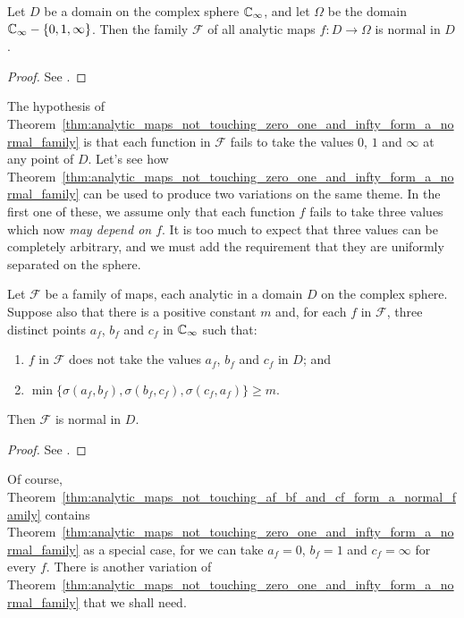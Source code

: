 \begin{theorem}
    \label{thm:analytic_maps_not_touching_zero_one_and_infty_form_a_normal_family}
    Let $D$ be a domain on the complex sphere $\mathbb{C}_\infty$, and let $\Omega$ be the
    domain $\mathbb{C}_\infty - \{0, 1, \infty\}$. Then the family $\mathcal{F}$ of all
    analytic maps $f: D \to \Omega$ is normal in $D$.
\end{theorem}
\begin{proof}
    See \cite[59]{Beardon1991}.
\end{proof}

The hypothesis of
Theorem~\ref{thm:analytic_maps_not_touching_zero_one_and_infty_form_a_normal_family}
is that each function in $\mathcal{F}$ fails to take the values $0$, $1$ and
$\infty$ at any point of $D$. Let's see how
Theorem~\ref{thm:analytic_maps_not_touching_zero_one_and_infty_form_a_normal_family}
can be used to produce two variations on the same theme. In the first one of
these, we assume only that each function $f$ fails to take three values which
now \emph{may depend on $f$}. It is too much to expect that three values can be
completely arbitrary, and we must add the requirement that they are uniformly
separated on the sphere.

\begin{theorem}
    \label{thm:analytic_maps_not_touching_af_bf_and_cf_form_a_normal_family}
    Let $\mathcal{F}$ be a family of maps, each analytic in a domain $D$ on the
    complex sphere. Suppose also that there is a positive constant $m$ and, for
    each $f$ in $\mathcal{F}$, three distinct points $a_f$, $b_f$ and $c_f$ in
    $\mathbb{C}_\infty$ such that:
    \begin{enumerate}[label=(\roman*)]
        \item $f$ in $\mathcal{F}$ does not take the values $a_f$, $b_f$ and
        $c_f$ in $D$; and
        \item $\min\{\sigma(a_f, b_f), \sigma(b_f, c_f), \sigma(c_f, a_f)\} \geq
        m$.
    \end{enumerate}
    Then $\mathcal{F}$ is normal in $D$.
\end{theorem}
\begin{proof}
    See \cite[58]{Beardon1991}.
\end{proof}

Of course,
Theorem~\ref{thm:analytic_maps_not_touching_af_bf_and_cf_form_a_normal_family}
contains
Theorem~\ref{thm:analytic_maps_not_touching_zero_one_and_infty_form_a_normal_family}
as a special case, for we can take $a_f = 0$, $b_f = 1$ and $c_f = \infty$ for
every $f$. There is another variation of
Theorem~\ref{thm:analytic_maps_not_touching_zero_one_and_infty_form_a_normal_family}
that we shall need.

